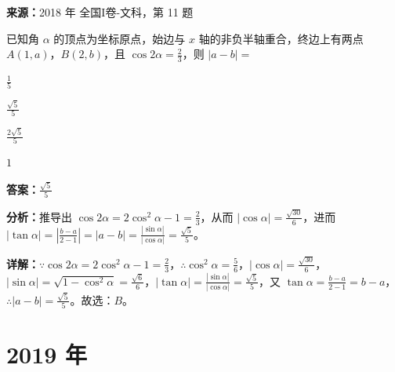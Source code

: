 \begin{question}[points=5]
\textbf{来源：}2018 年 全国I卷-文科，第 11 题\par
已知角 $\alpha$ 的顶点为坐标原点，始边与 $x$ 轴的非负半轴重合，终边上有两点 $A(1,a)$，$B(2,b)$，且 $\cos2\alpha=\frac{2}{3}$，则 $|a-b|=$
\begin{choices}
  \item $\frac{1}{5}$
  \item $\frac{\sqrt{5}}{5}$
  \item $\frac{2\sqrt{5}}{5}$
  \item $1$
\end{choices}
\begin{solution}
\textbf{答案：}$\frac{\sqrt{5}}{5}$

\textbf{分析：}推导出 $\cos2\alpha=2\cos^2\alpha-1=\frac{2}{3}$，从而 $|\cos\alpha|=\frac{\sqrt{30}}{6}$，进而 $|\tan\alpha|=|\frac{b-a}{2-1}|=|a-b|=\frac{|\sin\alpha|}{|\cos\alpha|}=\frac{\sqrt{5}}{5}$。

\textbf{详解：}$\because \cos2\alpha=2\cos^2\alpha-1=\frac{2}{3}$，$\therefore \cos^2\alpha=\frac{5}{6}$，$|\cos\alpha|=\frac{\sqrt{30}}{6}$，$|\sin\alpha|=\sqrt{1-\cos^2\alpha}=\frac{\sqrt{6}}{6}$，$|\tan\alpha|=\frac{|\sin\alpha|}{|\cos\alpha|}=\frac{\sqrt{5}}{5}$，又 $\tan\alpha=\frac{b-a}{2-1}=b-a$，$\therefore |a-b|=\frac{\sqrt{5}}{5}$。故选：$B$。
\end{solution}
\end{question}

\section*{2019 年}


